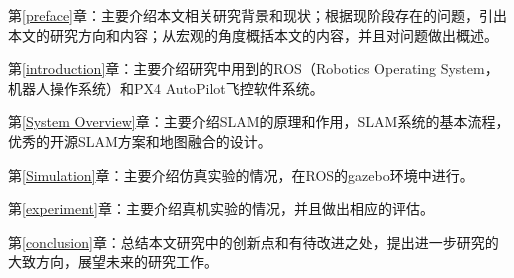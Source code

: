 第\ref{preface}章：主要介绍本文相关研究背景和现状；根据现阶段存在的问题，引出本文的研究方向和内容；从宏观的角度概括本文的内容，并且对问题做出概述。

第\ref{introduction}章：主要介绍研究中用到的ROS（Robotics Operating System，机器人操作系统）和PX4 AutoPilot飞控软件系统。

第\ref{System Overview}章：主要介绍SLAM的原理和作用，SLAM系统的基本流程，优秀的开源SLAM方案和地图融合的设计。

第\ref{Simulation}章：主要介绍仿真实验的情况，在ROS的gazebo环境中进行。

第\ref{experiment}章：主要介绍真机实验的情况，并且做出相应的评估。

第\ref{conclusion}章：总结本文研究中的创新点和有待改进之处，提出进一步研究的大致方向，展望未来的研究工作。

